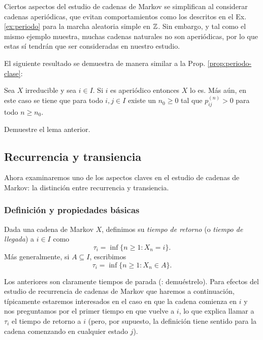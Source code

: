 Ciertos aspectos del estudio de cadenas de Markov se simplifican al considerar cadenas aperiódicas, que evitan comportamientos como los descritos en el Ex. \ref{ex:periodo} para la marcha aleatoria simple en $\mathbb{Z}$.
Sin embargo, y tal como el mismo ejemplo muestra, muchas cadenas naturales no son aperiódicas, por lo que estas sí tendrán que ser consideradas en nuestro estudio.

El siguiente resultado se demuestra de manera similar a la Prop. \ref{prop:periodo-clase}:

\begin{lem}
Sea $X$ irreducible y sea $i\in I$.
Si $i$ es aperiódico entonces $X$ lo es.
Más aún, en este caso se tiene que para todo $i,j\in I$ existe un $n_0\geq0$ tal que $p_{ij}^{(n)}>0$ para todo $n\geq n_0$.
\end{lem}

\begin{exer}
Demuestre el lema anterior.
\end{exer}

\subsection{Recurrencia y transiencia}

Ahora examinaremos uno de los aspectos claves en el estudio de cadenas de Markov: la distinción entre recurrencia y transiencia.

\subsubsection{Definición y propiedades básicas}

\begin{defn}
Dada una cadena de Markov $X$, definimos su \emph{tiempo de retorno} (o \emph{tiempo de llegada}) a $i\in I$ como
\[\tau_i=\inf\{n\geq1\!:X_n=i\}.\]
Más generalmente, si $A\subseteq I$, escribimos
\[\tau_i=\inf\{n\geq1\!:X_n\in A\}.\]
\end{defn}

Los anteriores son claramente tiempos de parada (\uexers: demuéstrelo).
Para efectos del estudio de recurrencia de cadenas de Markov que haremos a continuación, típicamente estaremos interesados en el caso en que la cadena comienza en $i$ y nos preguntamos por el primer tiempo en que vuelve a $i$, lo que explica llamar a $\tau_i$ el tiempo de retorno a $i$ (pero, por supuesto, la definición tiene sentido para la cadena comenzando en cualquier estado $j$).

